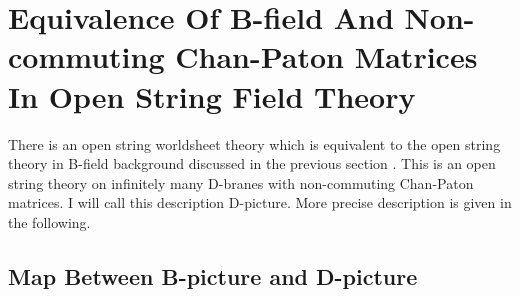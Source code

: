 \documentclass[a4paper,12pt]{article}
\begin{document}
\section{Equivalence Of B-field
And Non-commuting Chan-Paton Matrices
In Open String Field Theory}\label{secD}

There is an open string worldsheet theory
which is equivalent to the open string
theory in B-field background
discussed in the previous section \cite{Ish}.
This is an open string theory
on infinitely many D-branes
with non-commuting Chan-Paton matrices.
I will call this description
D-picture.
More precise description is given in the following.
\subsection{Map Between B-picture and D-picture}

\end{document}
